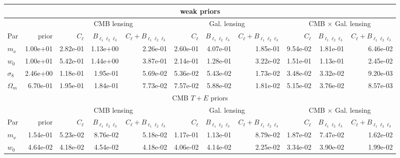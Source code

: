 \documentclass[11pt]{article} %
\begin{document}
\begin{table}
    \centering
    \scriptsize
    \begin{tabular}{|l|r|rrr|rrr|rrr|}
        \hline
        \multicolumn{11}{|c|}{weak priors} \\
        \hline
        && \multicolumn{3}{c|}{CMB lensing}& \multicolumn{3}{c|}{Gal. lensing}& \multicolumn{3}{c|}{CMB $\times$ Gal. lensing} \\
        \hline
        Par            &   prior &   $C_\ell$ &   $B_{\ell_1\ell_2\ell_3}$ &   $C_\ell + B_{\ell_1\ell_2\ell_3}$ &   $C_\ell$ &   $B_{\ell_1\ell_2\ell_3}$ &   $C_\ell + B_{\ell_1\ell_2\ell_3}$ &   $C_\ell$ &   $B_{\ell_1\ell_2\ell_3}$ &   $C_\ell + B_{\ell_1\ell_2\ell_3}$ \\
        \hline
        $m_\nu$    &     1.00e+01 &  2.82e-01 &  1.13e+00 &        2.26e-01 & 2.60e-01 & 4.07e-01 &      1.85e-01 &      9.54e-02 &      1.81e-01 &             6.46e-02 \\
        $w_0$      &     1.00e+01 &  5.42e-01 &  1.44e+00 &        3.87e-01 & 2.14e-01 & 1.28e-01 &      3.22e-02 &      1.51e-01 &      1.13e-01 &             2.45e-02 \\
        $\sigma_8$ &     2.46e+00 &  1.18e-01 &  1.95e-01 &        5.69e-02 & 5.36e-02 & 5.43e-02 &      1.73e-02 &      3.48e-02 &      3.32e-02 &             9.20e-03 \\
        $\Omega_m$ &     6.70e-01 &  1.95e-01 &  1.84e-01 &        7.73e-02 & 7.57e-02 & 5.88e-02 &      1.81e-02 &      5.15e-02 &      3.76e-02 &             8.57e-03 \\
       \hline
        \multicolumn{11}{|c|}{CMB $T + E$ priors} \\
        \hline
        && \multicolumn{3}{c|}{CMB lensing}& \multicolumn{3}{c|}{Gal. lensing}& \multicolumn{3}{c|}{CMB $\times$ Gal. lensing} \\
        \hline
         Par            &   prior &   $C_\ell$ &   $B_{\ell_1\ell_2\ell_3}$ &   $C_\ell + B_{\ell_1\ell_2\ell_3}$ &   $C_\ell$ &   $B_{\ell_1\ell_2\ell_3}$ &   $C_\ell + B_{\ell_1\ell_2\ell_3}$ &   $C_\ell$ &   $B_{\ell_1\ell_2\ell_3}$ &   $C_\ell + B_{\ell_1\ell_2\ell_3}$ \\
        \hline
        $m_\nu$    &    1.54e-01 &  5.23e-02 &  8.76e-02 &        5.18e-02 & 1.17e-01 & 1.13e-01 &      8.79e-02 &      1.87e-02 &      7.47e-02 &             1.62e-02 \\
        $w_0$      &    4.64e-02 &  4.18e-02 &  4.54e-02 &        4.18e-02 & 4.06e-02 & 4.14e-02 &      2.25e-02 &      3.34e-02 &      3.90e-02 &             1.99e-02 \\

\end{tabular}
\end{table}
\end{document}
